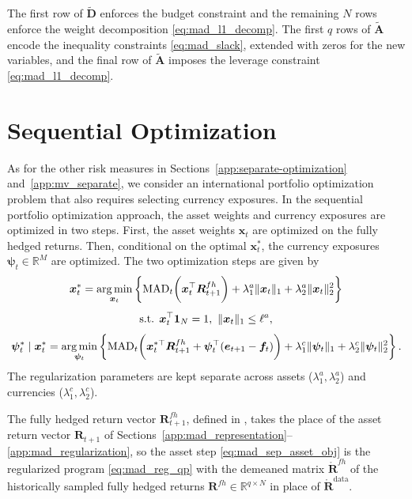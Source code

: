 The first row of $\tilde{\bm{D}}$ enforces the budget constraint and the remaining $N$ rows enforce the weight
decomposition \eqref{eq:mad_l1_decomp}. The first $q$ rows of $\tilde{\bm{A}}$ encode the inequality constraints
\eqref{eq:mad_slack}, extended with zeros for the new variables, and the final row of $\tilde{\bm{A}}$ imposes the
leverage constraint \eqref{eq:mad_l1_decomp}.

\section{Sequential Optimization} \label{app:mad_separate}

As for the other risk measures in Sections~\ref{app:separate-optimization} and~\ref{app:mv_separate}, we consider  an
international portfolio optimization problem that also requires selecting currency exposures. In the sequential portfolio optimization approach,
the asset weights and currency exposures are optimized in two steps. First, the asset weights $\bm{x}_t$ are optimized
on the fully hedged returns. Then, conditional on the optimal $\bm{x}_t^*$, the currency exposures
$\bm{\psi}_t \in \mathbb{R}^M$ are optimized. The two optimization steps are given by
\begin{equation} \label{eq:mad_sep_asset_obj}
\begin{gathered}
    \bm{x}_t^* = \operatorname*{arg\,min}_{\bm{x}_t} \left\{ \text{MAD}_t\biggl( \bm{x}_t^\top \bm{R}^{fh}_{t+1} \biggr)
    + \lambda_1^a \|\bm{x}_t\|_1 + \lambda_2^a \|\bm{x}_t\|_2^2 \right\} \\[4pt]
    \text{s.t. } \bm{x}_t^\top \bm{1}_N = 1,\ \|\bm{x}_t\|_1 \le \ell^a,
\end{gathered}
\end{equation}
\begin{equation} \label{eq:mad_sep_curr_obj}
    \bm{\psi}_t^* \mid \bm{x}_t^* = \operatorname*{arg\,min}_{\bm{\psi}_t} \left\{
    \text{MAD}_t\biggl( \bm{x}_t^{*\top} \bm{R}^{fh}_{t+1} + \bm{\psi}_t^\top (\bm{e}_{t+1} - \bm{f}_t) \biggr)
    + \lambda_1^c \|\bm{\psi}_t\|_1 + \lambda_2^c \|\bm{\psi}_t\|_2^2 \right\}.
\end{equation}
The regularization parameters are kept separate across assets ($\lambda_1^a, \lambda_2^a$) and currencies
($\lambda_1^c, \lambda_2^c$).

The fully hedged return vector $\bm{R}^{fh}_{t+1}$, defined in , takes the place of
the asset return vector $\bm{R}_{t+1}$ of Sections~\ref{app:mad_representation}--\ref{app:mad_regularization}, so the
asset step \eqref{eq:mad_sep_asset_obj} is the regularized program \eqref{eq:mad_reg_qp} with the demeaned matrix
$\mathring{\bm{R}}^{fh}$ of the historically sampled fully hedged returns $\bm{R}^{fh} \in \mathbb{R}^{q \times N}$ in
place of $\mathring{\bm{R}}^{\text{data}}$.

